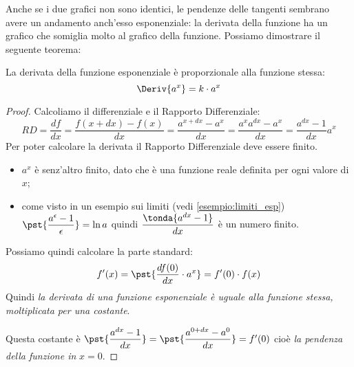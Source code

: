 Anche se i due grafici non sono identici, le pendenze delle tangenti 
sembrano avere un andamento anch'esso esponenziale: la derivata della 
funzione ha un grafico che somiglia molto al grafico della funzione. 
Possiamo dimostrare il seguente teorema:

\begin{teorema}
La derivata della funzione esponenziale è proporzionale alla funzione 
stessa:
\[\Deriv{a^x}=k \cdot a^x\]
\end{teorema}
\begin{proof}
Calcoliamo il differenziale e il Rapporto Differenziale: 
\[RD = \dfrac{df}{dx} = \dfrac{f(x + dx) - f(x)}{dx} = 
       \dfrac{a^{x+dx}-a^x}{dx} = 
       \dfrac{a^xa^{dx}-a^x}{dx} = 
       \dfrac{a^{dx}-1}{dx} a^x\]
Per poter calcolare la derivata il Rapporto Differenziale deve essere 
finito.
\begin{itemize}
\item 
\(a^x\) è senz'altro finito, dato che è una funzione reale definita per ogni 
valore di \(x\);
\item 
come visto in un esempio sui limiti (vedi \ref{esempio:limiti_esp})
\(\pst{\dfrac{a^\epsilon-1}{\epsilon}}=\ln{a}\) quindi 
\(\dfrac{\tonda{a^{dx}-1}}{dx}\) è un numero finito.
\end{itemize}
Possiamo quindi calcolare la parte standard:
\[f'(x)= \pst{\dfrac{df(0)}{dx}\cdot a^x}=f'(0) \cdot f(x)\]
Quindi \emph{la derivata di una funzione esponenziale è uguale alla
funzione stessa, moltiplicata per una costante}.

\noindent Questa costante è 
\(\pst{\dfrac{a^{dx}-1}{dx}} = \pst{\dfrac{a^{0+dx}-a^0}{dx}} = f'(0)\)
cioè \emph{la pendenza della funzione in} \(x=0\).
\end{proof}



